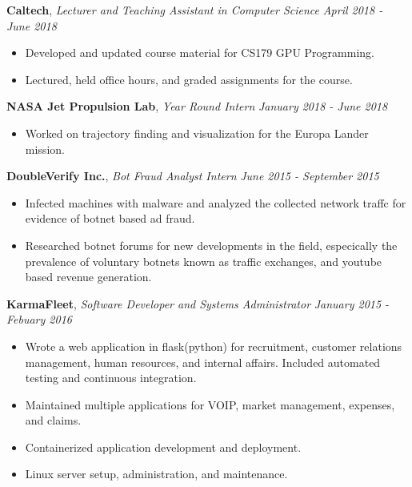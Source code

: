 \documentclass[9pt]{article}
\newenvironment{changemargin}[2]{%
  \begin{list}{}{%
    \setlength{\topsep}{0pt}%
    \setlength{\leftmargin}{#1}%
    \setlength{\rightmargin}{#2}%
    \setlength{\listparindent}{\parindent}%
    \setlength{\itemindent}{\parindent}%
    \setlength{\parsep}{\parskip}%
  }%
  \item[]}{\end{list}
}
\newenvironment{body} {
	\vspace*{-16pt}
	\begin{changemargin}{-0.25in}{-0.5in}
  }	
	{\end{changemargin}
}
\begin{document}
\begin{body}
	\textbf{Caltech}, \emph{Lecturer and Teaching Assistant in Computer Science} \hfill \emph{April 2018 - June 2018}\\
	\vspace*{-3pt}
	\begin{itemize} \itemsep -0pt %
		\item Developed and updated course material for CS179 GPU Programming.
		\item Lectured, held office hours, and graded assignments for the course.
	\end{itemize}
	\vspace*{-2pt}

	\textbf{NASA Jet Propulsion Lab}, \emph{Year Round Intern} \hfill \emph{January 2018 - June 2018}\\
	\vspace*{-3pt}
	\begin{itemize} \itemsep -0pt %
		\item Worked on trajectory finding and visualization for the Europa Lander mission.
	\end{itemize}
	\vspace*{-2pt}

	\textbf{DoubleVerify Inc.}, \emph{Bot Fraud Analyst Intern} \hfill \emph{June 2015 - September 2015}\\
	\vspace*{-3pt}
	\begin{itemize} \itemsep -0pt %
		\item Infected machines with malware and analyzed the collected network traffc for evidence of botnet based ad fraud.
		\item Researched botnet forums for new developments in the field, especically the prevalence of voluntary botnets known as traffic exchanges, and youtube based revenue generation.
	\end{itemize}
	\vspace*{-2pt}

	\textbf{KarmaFleet}, \emph{Software Developer and Systems Administrator} \hfill \emph{January 2015 - Febuary 2016}\\
	\vspace*{-3pt}
	\begin{itemize} \itemsep -0pt %
		\item Wrote a web application in flask(python) for recruitment, customer relations management, human resources, and internal affairs. Included automated testing and continuous integration.
		\item Maintained multiple applications for VOIP, market management, expenses, and claims.
		\item Containerized application development and deployment.
		\item Linux server setup, administration, and maintenance.
	\end{itemize}
	\vspace*{-2pt}


\end{body}
\end{document}
